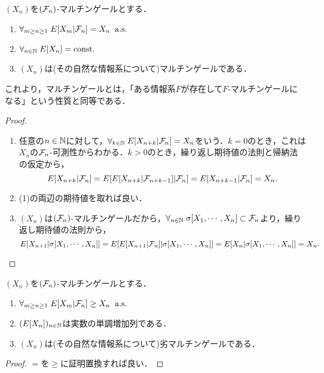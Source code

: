 \documentclass[uplatex,dvipdfmx]{jsreport}
\begin{document}
\begin{lemma}[マルチンゲールの基本性質]
    $(X_n)$を$(\mathcal{F}_n)$-マルチンゲールとする．
    \begin{enumerate}
        \item $\forall_{m\ge n\ge1}\;E[X_m|\mathcal{F}_n]=X_n\;\;\mathrm{a.s.}$
        \item $\forall_{n\in\mathbb{N}}\;E[X_n]=\mathrm{const.}$
        \item $(X_n)$は(その自然な情報系について)マルチンゲールである．
    \end{enumerate}
    これより，マルチンゲールとは，「ある情報系$F$が存在して$F$-マルチンゲールになる」という性質と同等である．
\end{lemma}
\begin{proof}\mbox{}
    \begin{enumerate}
        \item 任意の$n\in\mathbb{N}$に対して，$\forall_{k\in\mathbb{N}}\;E[X_{n+k}|\mathcal{F}_n]=X_n$をいう．$k=0$のとき，これは$X_n$の$\mathcal{F}_n$-可測性からわかる．$k>0$のとき，繰り返し期待値の法則と帰納法の仮定から，
        \[E[X_{n+k}|\mathcal{F}_n]=E[E[X_{n+k}|\mathcal{F}_{n+k-1}]|\mathcal{F}_n]=E[X_{n+k-1}|\mathcal{F}_n]=X_n.\]
        \item (1)の両辺の期待値を取れば良い．
        \item $(X_n)$は$(\mathcal{F}_n)$-マルチンゲールだから，$\forall_{n\in\mathbb{N}}\;\sigma[X_1,\cdots,X_n]\subset\mathcal{F}_n$より，繰り返し期待値の法則から，
        \[E[X_{n+1}|\sigma[X_1,\cdots,X_n]]=E[E[X_{n+1}|\mathcal{F}_n]|\sigma[X_1,\cdots,X_n]]=E[X_n|\sigma[X_1,\cdots,X_n]]=X_n.\]
    \end{enumerate}
\end{proof}

\begin{lemma}[劣マルチンゲールの基本性質]
    $(X_n)$を$(\mathcal{F}_n)$-マルチンゲールとする．
    \begin{enumerate}
        \item $\forall_{m\ge n\ge1}\;E[X_m|\mathcal{F}_n]\ge X_n\;\;\mathrm{a.s.}$
        \item $(E[X_n])_{n\in\mathbb{N}}$は実数の単調増加列である．
        \item $(X_n)$は(その自然な情報系について)劣マルチンゲールである．
    \end{enumerate}
\end{lemma}
\begin{proof}
    $=$を$\ge$に証明置換すれば良い．
\end{proof}
\end{document}
